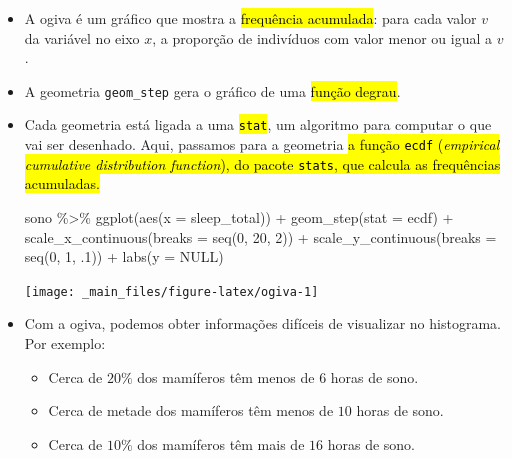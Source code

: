 \documentclass[
  11pt]{report}
\newenvironment{Shaded}{\begin{snugshade}}{\end{snugshade}}
\newcommand{\AttributeTok}[1]{\textcolor[rgb]{0.77,0.63,0.00}{#1}}
\newcommand{\ConstantTok}[1]{\textcolor[rgb]{0.00,0.00,0.00}{#1}}
\newcommand{\DecValTok}[1]{\textcolor[rgb]{0.00,0.00,0.81}{#1}}
\newcommand{\FunctionTok}[1]{\textcolor[rgb]{0.00,0.00,0.00}{#1}}
\newcommand{\NormalTok}[1]{#1}
\newcommand{\SpecialCharTok}[1]{\textcolor[rgb]{0.00,0.00,0.00}{#1}}
\newcommand{\StringTok}[1]{\textcolor[rgb]{0.31,0.60,0.02}{#1}}
\renewenvironment{Shaded}{
  \begin{mdframed}[%
    roundcorner=2pt,%
    innerleftmargin=5pt,%
    innerrightmargin=5pt,%
    topline=true,%
    leftline=true,%
    rightline=true,%
    bottomline=true,%
    linewidth=0.5pt,%
    linecolor=black!20,%
    backgroundcolor=black!2,%
    skipabove=2ex,%
    skipbelow=2.5ex%
  ]%
}
{
  \end{mdframed}
}
\begin{document}
\begin{itemize}
\item
  A ogiva é um gráfico que mostra a {\hl{frequência acumulada}}: para cada valor $v$ da variável no eixo $x$, a proporção de indivíduos com valor menor ou igual a $v$.
\item
  A geometria \texttt{geom\_step} gera o gráfico de uma {\hl{função degrau}}.
\item
  Cada geometria está ligada a uma {\hl{\texttt{stat}}}, um algoritmo para computar o que vai ser desenhado. Aqui, passamos para a geometria {\hl{a função \texttt{ecdf} (\emph{empirical cumulative distribution function}), do pacote \texttt{stats}, que calcula as frequências acumuladas.}}

\begin{Shaded}
\begin{Highlighting}[]
\NormalTok{sono }\SpecialCharTok{\%\textgreater{}\%} 
  \FunctionTok{ggplot}\NormalTok{(}\FunctionTok{aes}\NormalTok{(}\AttributeTok{x =}\NormalTok{ sleep\_total)) }\SpecialCharTok{+}
    \FunctionTok{geom\_step}\NormalTok{(}\AttributeTok{stat =} \StringTok{\textquotesingle{}ecdf\textquotesingle{}}\NormalTok{) }\SpecialCharTok{+}
    \FunctionTok{scale\_x\_continuous}\NormalTok{(}\AttributeTok{breaks =} \FunctionTok{seq}\NormalTok{(}\DecValTok{0}\NormalTok{, }\DecValTok{20}\NormalTok{, }\DecValTok{2}\NormalTok{)) }\SpecialCharTok{+}
    \FunctionTok{scale\_y\_continuous}\NormalTok{(}\AttributeTok{breaks =} \FunctionTok{seq}\NormalTok{(}\DecValTok{0}\NormalTok{, }\DecValTok{1}\NormalTok{, .}\DecValTok{1}\NormalTok{)) }\SpecialCharTok{+}
    \FunctionTok{labs}\NormalTok{(}\AttributeTok{y =} \ConstantTok{NULL}\NormalTok{)}
\end{Highlighting}
\end{Shaded}

  \begin{center}\texttt{[image: \_main\_files/figure-latex/ogiva-1]} \end{center}
\item
  Com a ogiva, podemos obter informações difíceis de visualizar no histograma. Por exemplo:

  \begin{itemize}
  \item
    Cerca de $20\%$ dos mamíferos têm menos de $6$ horas de sono.
  \item
    Cerca de metade dos mamíferos têm menos de $10$ horas de sono.
  \item
    Cerca de $10\%$ dos mamíferos têm mais de $16$ horas de sono.
  \end{itemize}
\end{itemize}
\end{document}
